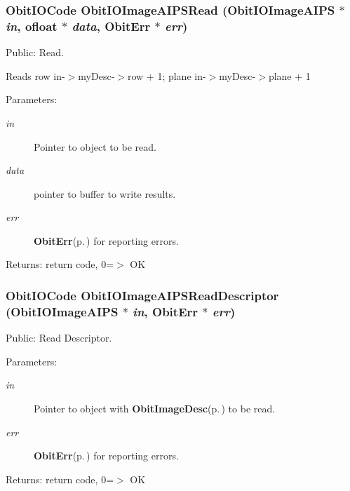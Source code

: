 \subsubsection{\setlength{\rightskip}{0pt plus 5cm}Obit\-IOCode Obit\-IOImage\-AIPSRead ({\bf Obit\-IOImage\-AIPS} $\ast$ {\em in}, {\bf ofloat} $\ast$ {\em data}, {\bf Obit\-Err} $\ast$ {\em err})}\label{ObitIOImageAIPS_8c_a15}


Public: Read. 

Reads row in-$>$my\-Desc-$>$row + 1; plane in-$>$my\-Desc-$>$plane + 1 \begin{Desc}
\item[Parameters:]
\begin{description}
\item[{\em in}]Pointer to object to be read. \item[{\em data}]pointer to buffer to write results. \item[{\em err}]{\bf Obit\-Err}{\rm (p.\,\pageref{structObitErr})} for reporting errors. \end{description}
\end{Desc}
\begin{Desc}
\item[Returns:]return code, 0=$>$ OK \end{Desc}
\subsubsection{\setlength{\rightskip}{0pt plus 5cm}Obit\-IOCode Obit\-IOImage\-AIPSRead\-Descriptor ({\bf Obit\-IOImage\-AIPS} $\ast$ {\em in}, {\bf Obit\-Err} $\ast$ {\em err})}\label{ObitIOImageAIPS_8c_a17}


Public: Read Descriptor. 

\begin{Desc}
\item[Parameters:]
\begin{description}
\item[{\em in}]Pointer to object with {\bf Obit\-Image\-Desc}{\rm (p.\,\pageref{structObitImageDesc})} to be read. \item[{\em err}]{\bf Obit\-Err}{\rm (p.\,\pageref{structObitErr})} for reporting errors. \end{description}
\end{Desc}
\begin{Desc}
\item[Returns:]return code, 0=$>$ OK \end{Desc}
